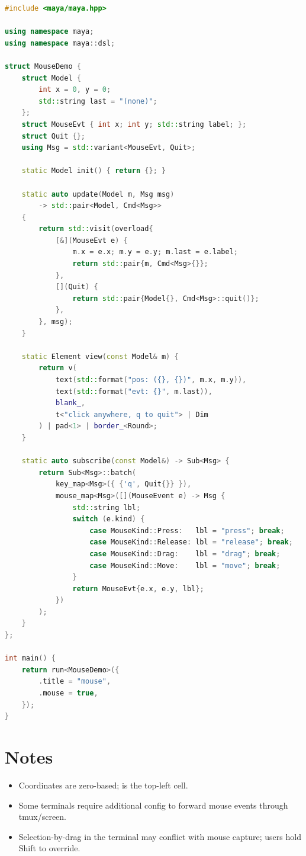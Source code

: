 \begin{lstlisting}[language=C++]
#include <maya/maya.hpp>

using namespace maya;
using namespace maya::dsl;

struct MouseDemo {
    struct Model {
        int x = 0, y = 0;
        std::string last = "(none)";
    };
    struct MouseEvt { int x; int y; std::string label; };
    struct Quit {};
    using Msg = std::variant<MouseEvt, Quit>;

    static Model init() { return {}; }

    static auto update(Model m, Msg msg)
        -> std::pair<Model, Cmd<Msg>>
    {
        return std::visit(overload{
            [&](MouseEvt e) {
                m.x = e.x; m.y = e.y; m.last = e.label;
                return std::pair{m, Cmd<Msg>{}};
            },
            [](Quit) {
                return std::pair{Model{}, Cmd<Msg>::quit()};
            },
        }, msg);
    }

    static Element view(const Model& m) {
        return v(
            text(std::format("pos: ({}, {})", m.x, m.y)),
            text(std::format("evt: {}", m.last)),
            blank_,
            t<"click anywhere, q to quit"> | Dim
        ) | pad<1> | border_<Round>;
    }

    static auto subscribe(const Model&) -> Sub<Msg> {
        return Sub<Msg>::batch(
            key_map<Msg>({ {'q', Quit{}} }),
            mouse_map<Msg>([](MouseEvent e) -> Msg {
                std::string lbl;
                switch (e.kind) {
                    case MouseKind::Press:   lbl = "press"; break;
                    case MouseKind::Release: lbl = "release"; break;
                    case MouseKind::Drag:    lbl = "drag"; break;
                    case MouseKind::Move:    lbl = "move"; break;
                }
                return MouseEvt{e.x, e.y, lbl};
            })
        );
    }
};

int main() {
    return run<MouseDemo>({
        .title = "mouse",
        .mouse = true,
    });
}
\end{lstlisting}

\section{Notes}

\begin{itemize}[leftmargin=*]
  \item Coordinates are zero-based;  is the
    top-left cell.
  \item Some terminals require additional config to forward
    mouse events through tmux/screen.
  \item Selection-by-drag in the terminal may conflict with
    \maya{} mouse capture; users hold Shift to override.
\end{itemize}

